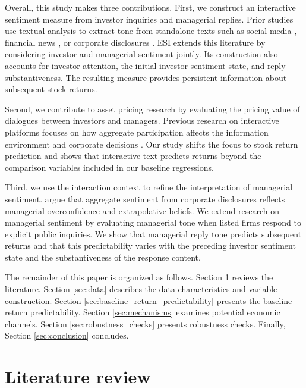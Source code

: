 \documentclass[12pt]{article}
\begin{document}
Overall, this study makes three contributions. First, we construct an interactive sentiment measure from investor inquiries and managerial replies. Prior studies use textual analysis to extract tone from standalone texts such as social media \citep{bartov2018,chen2014,cookson2024}, financial news \citep{ke2021predicting,lopez2023chatgpt}, or corporate disclosures \citep{jiang2019}. ESI extends this literature by considering investor and managerial sentiment jointly. Its construction also accounts for investor attention, the initial investor sentiment state, and reply substantiveness. The resulting measure provides persistent information about subsequent stock returns.

Second, we contribute to asset pricing research by evaluating the pricing value of dialogues between investors and managers. Previous research on interactive platforms focuses on how aggregate participation affects the information environment and corporate decisions \citep{lee2022shall,xu2024}. Our study shifts the focus to stock return prediction and shows that interactive text predicts returns beyond the comparison variables included in our baseline regressions. 

Third, we use the interaction context to refine the interpretation of managerial sentiment. \citet{jiang2019} argue that aggregate sentiment from corporate disclosures reflects managerial overconfidence and extrapolative beliefs. We extend research on managerial sentiment by evaluating managerial tone when listed firms respond to explicit public inquiries. We show that managerial reply tone predicts subsequent returns and that this predictability varies with the preceding investor sentiment state and the substantiveness of the response content.


The remainder of this paper is organized as follows. Section \ref{sec:literature_review} reviews the literature. Section \ref{sec:data} describes the data characteristics and variable construction. Section \ref{sec:baseline_return_predictability} presents the baseline return predictability. Section \ref{sec:mechanisms} examines potential economic channels. Section \ref{sec:robustness_checks} presents robustness checks. Finally, Section \ref{sec:conclusion} concludes.





\section{Literature review}\label{sec:literature_review}
\end{document}
